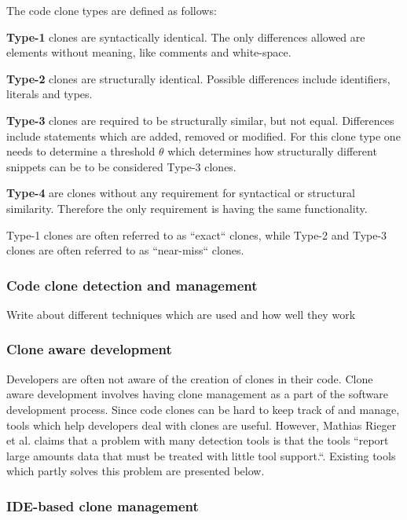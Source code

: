 \documentclass[12pt]{article}
\begin{document}
The code clone types are defined as follows:

\textbf{Type-1} clones are syntactically identical. The only differences allowed are elements
without meaning, like comments and white-space. 

\textbf{Type-2} clones are structurally identical. Possible differences include
identifiers, literals and types. 

\textbf{Type-3} clones are required to be structurally similar, but not equal. Differences
include statements which are added, removed or modified. For this clone type one needs to
determine a threshold $\theta$ which determines how structurally different snippets can be
to be considered Type-3 clones.\cite{Inoue_introduction_to_cc}

\textbf{Type-4} are clones without any requirement for syntactical or structural similarity. Therefore
the only requirement is having the same functionality.

Type-1 clones are often referred to as ``exact`` clones, while Type-2 and Type-3 clones are
often referred to as ``near-miss`` clones.\cite[1]{Zibran_real_time_search}

\subsubsection{Code clone detection and management}

Write about different techniques which are used and how well they work

\subsubsection{Clone aware development}

Developers are often not aware of the creation of clones in their code. Clone aware
development involves having clone management as a part of the software development
process. Since code clones can be hard to keep track of and manage, tools which help
developers deal with clones are useful. However, Mathias Rieger et al. claims that
a problem with many detection tools is that the tools ``report large amounts data that must
be treated with little tool support.``\cite[1]{InsightsSystemWideDuplication}. Existing
tools which partly solves this problem are presented below. 
\subsubsection{IDE-based clone management}
\end{document}
